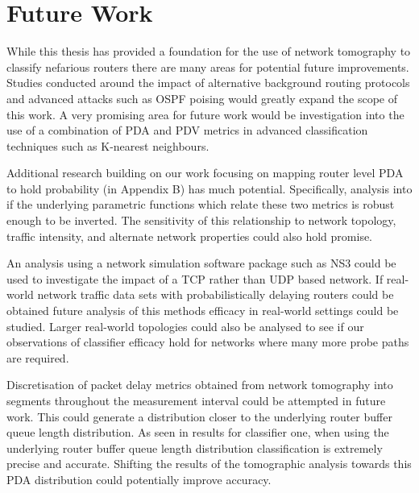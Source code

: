 \section{Future Work}
\label{sec:Cfuture}
While this thesis has provided a foundation for the use of network tomography to classify nefarious routers there are many areas for potential future improvements. Studies conducted around the impact of alternative background routing protocols and advanced attacks such as OSPF poising would greatly expand the scope of this work. A very promising area for future work would be investigation into the use of a combination of PDA and PDV metrics in advanced classification techniques such as K-nearest neighbours.\par
Additional research building on our work focusing on mapping router level PDA to hold probability (in Appendix B) has much potential. Specifically, analysis into if the underlying parametric functions which relate these two metrics is robust enough to be inverted. The sensitivity of this relationship to network topology, traffic intensity, and alternate network properties could also hold promise.\par 
An analysis using a network simulation software package such as NS3 could be used to investigate the impact of a TCP rather than UDP based network. If real-world network traffic data sets with probabilistically delaying routers could be obtained future analysis of this methods efficacy in real-world settings could be studied. Larger real-world topologies could also be analysed to see if our observations of classifier efficacy hold for networks where many more probe paths are required.\par
Discretisation of packet delay metrics obtained from network tomography into segments throughout the measurement interval could be attempted in future work. This could generate a distribution closer to the underlying router buffer queue length distribution. As seen in results for classifier one, when using the underlying router buffer queue length distribution classification is extremely precise and accurate. Shifting the results of the tomographic analysis towards this PDA distribution could potentially improve accuracy.
